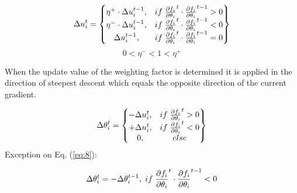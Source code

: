 \begin{equation}\label{eq:7}
	\Delta u^t_i =
	\begin{Bmatrix}
		 \eta^+ \cdot \Delta u^{t-1}_i, & if \hspace{1 mm} \pdv{f_i}{\theta_i}^t \cdot \pdv{f_i}{\theta_i}^{t-1} > 0 \\
		 \eta^- \cdot \Delta u^{t-1}_i, & if \hspace{1 mm} \pdv{f_i}{\theta_i}^t \cdot \pdv{f_i}{\theta_i}^{t-1} < 0 \\
		  \Delta u^{t-1}_i, & if \hspace{1 mm} \pdv{f_i}{\theta_i}^t \cdot \pdv{f_i}{\theta_i}^{t-1} = 0 \\
	\end{Bmatrix}
\end{equation}
\begin{equation}\label{eq:9}
0 <\eta^-<1<\eta^+
\end{equation}

When the update value of the weighting factor is determined it is applied in the direction of steepest descent which equals the opposite direction of the current gradient. 

\begin{equation}\label{eq:8}
\Delta \theta^t_i =
\begin{Bmatrix}
	-\Delta u^t_i, & if \hspace{1 mm} \pdv{f_i}{\theta_i}^t > 0 \\
	+ \Delta u^t_i, & if \hspace{1 mm} \pdv{f_i}{\theta_i}^t < 0 \\
	0, & else 
\end{Bmatrix}
\end{equation}
Exception on Eq. (\ref{eq:8}):

\begin{equation}\label{eq:10}
	\Delta \theta^t_i = -\Delta \theta^{t-1}_i, \hspace{1mm} if \hspace{1mm} \pdv{f_i}{\theta_i}^t \cdot \pdv{f_i}{\theta_i}^{t-1} < 0
\end{equation}



